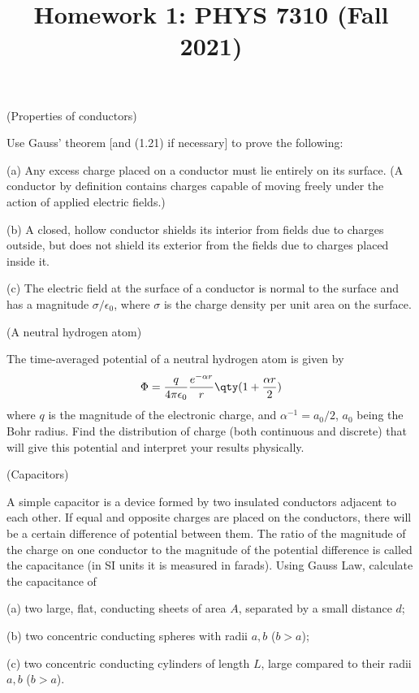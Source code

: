 \documentclass[12pt]{article}
\title{Homework 1: PHYS 7310 (Fall 2021)}
\begin{document}
\maketitle

\begin{problem}[Problem 1.1]{(Properties of conductors)}

Use Gauss' theorem [and (1.21) if necessary] to prove the following:

(a) Any excess charge placed on a conductor must lie entirely on its surface. (A
conductor by definition contains charges capable of moving freely under the
action of applied electric fields.)

(b) A closed, hollow conductor shields its interior from fields due to charges
outside, but does not shield its exterior from the fields due to charges placed
inside it.

(c) The electric field at the surface of a conductor is normal to the surface
and has a magnitude $\sigma/\epsilon_0$, where $\sigma$ is the charge density
per unit area on the surface.

\end{problem}


\begin{problem}[Problem 1.2]{(A neutral hydrogen atom)}

The time-averaged potential of a neutral hydrogen atom is given by
\begin{equation}
    \Phi=\frac{q}{4\pi\epsilon_0}\frac{e^{-\alpha r}}{r}\qty(1+\frac{\alpha
    r}{2}) 
\end{equation}
where $q$ is the magnitude of the electronic charge, and $\alpha^{-1}=a_0/2$,
$a_0$ being the Bohr radius. Find the distribution of charge (both continuous
and discrete) that will give this potential and interpret your results
physically.

\end{problem}


\begin{problem}[Problem 1.3]{(Capacitors)}

A simple capacitor is a device formed by two insulated conductors adjacent to
each other. If equal and opposite charges are placed on the conductors, there
will be a certain difference of potential between them. The ratio of the
magnitude of the charge on one conductor to the magnitude of the potential
difference is called the capacitance (in SI units it is measured in farads).
Using Gauss Law, calculate the capacitance of

(a) two large, flat, conducting sheets of area $A$, separated by a small
distance $d$;

(b) two concentric conducting spheres with radii $a,b$ ($b>a$);

(c) two concentric conducting cylinders of length $L$, large compared to their
radii $a,b$ ($b>a$).
    
\end{problem}
\end{document}
